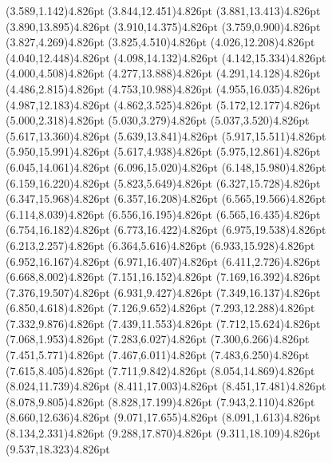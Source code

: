 \documentclass[10pt]{article}
\begin{document}
{{\qdisk(3.589,1.142){4.826pt}%
\qdisk(3.844,12.451){4.826pt}%
\qdisk(3.881,13.413){4.826pt}%
\qdisk(3.890,13.895){4.826pt}%
\qdisk(3.910,14.375){4.826pt}%
\qdisk(3.759,0.900){4.826pt}%
\qdisk(3.827,4.269){4.826pt}%
\qdisk(3.825,4.510){4.826pt}%
\qdisk(4.026,12.208){4.826pt}%
\qdisk(4.040,12.448){4.826pt}%
\qdisk(4.098,14.132){4.826pt}%
\qdisk(4.142,15.334){4.826pt}%
\qdisk(4.000,4.508){4.826pt}%
\qdisk(4.277,13.888){4.826pt}%
\qdisk(4.291,14.128){4.826pt}%
\qdisk(4.486,2.815){4.826pt}%
\qdisk(4.753,10.988){4.826pt}%
\qdisk(4.955,16.035){4.826pt}%
\qdisk(4.987,12.183){4.826pt}%
\qdisk(4.862,3.525){4.826pt}%
\qdisk(5.172,12.177){4.826pt}%
\qdisk(5.000,2.318){4.826pt}%
\qdisk(5.030,3.279){4.826pt}%
\qdisk(5.037,3.520){4.826pt}%
\qdisk(5.617,13.360){4.826pt}%
\qdisk(5.639,13.841){4.826pt}%
\qdisk(5.917,15.511){4.826pt}%
\qdisk(5.950,15.991){4.826pt}%
\qdisk(5.617,4.938){4.826pt}%
\qdisk(5.975,12.861){4.826pt}%
\qdisk(6.045,14.061){4.826pt}%
\qdisk(6.096,15.020){4.826pt}%
\qdisk(6.148,15.980){4.826pt}%
\qdisk(6.159,16.220){4.826pt}%
\qdisk(5.823,5.649){4.826pt}%
\qdisk(6.327,15.728){4.826pt}%
\qdisk(6.347,15.968){4.826pt}%
\qdisk(6.357,16.208){4.826pt}%
\qdisk(6.565,19.566){4.826pt}%
\qdisk(6.114,8.039){4.826pt}%
\qdisk(6.556,16.195){4.826pt}%
\qdisk(6.565,16.435){4.826pt}%
\qdisk(6.754,16.182){4.826pt}%
\qdisk(6.773,16.422){4.826pt}%
\qdisk(6.975,19.538){4.826pt}%
\qdisk(6.213,2.257){4.826pt}%
\qdisk(6.364,5.616){4.826pt}%
\qdisk(6.933,15.928){4.826pt}%
\qdisk(6.952,16.167){4.826pt}%
\qdisk(6.971,16.407){4.826pt}%
\qdisk(6.411,2.726){4.826pt}%
\qdisk(6.668,8.002){4.826pt}%
\qdisk(7.151,16.152){4.826pt}%
\qdisk(7.169,16.392){4.826pt}%
\qdisk(7.376,19.507){4.826pt}%
\qdisk(6.931,9.427){4.826pt}%
\qdisk(7.349,16.137){4.826pt}%
\qdisk(6.850,4.618){4.826pt}%
\qdisk(7.126,9.652){4.826pt}%
\qdisk(7.293,12.288){4.826pt}%
\qdisk(7.332,9.876){4.826pt}%
\qdisk(7.439,11.553){4.826pt}%
\qdisk(7.712,15.624){4.826pt}%
\qdisk(7.068,1.953){4.826pt}%
\qdisk(7.283,6.027){4.826pt}%
\qdisk(7.300,6.266){4.826pt}%
\qdisk(7.451,5.771){4.826pt}%
\qdisk(7.467,6.011){4.826pt}%
\qdisk(7.483,6.250){4.826pt}%
\qdisk(7.615,8.405){4.826pt}%
\qdisk(7.711,9.842){4.826pt}%
\qdisk(8.054,14.869){4.826pt}%
\qdisk(8.024,11.739){4.826pt}%
\qdisk(8.411,17.003){4.826pt}%
\qdisk(8.451,17.481){4.826pt}%
\qdisk(8.078,9.805){4.826pt}%
\qdisk(8.828,17.199){4.826pt}%
\qdisk(7.943,2.110){4.826pt}%
\qdisk(8.660,12.636){4.826pt}%
\qdisk(9.071,17.655){4.826pt}%
\qdisk(8.091,1.613){4.826pt}%
\qdisk(8.134,2.331){4.826pt}%
\qdisk(9.288,17.870){4.826pt}%
\qdisk(9.311,18.109){4.826pt}%
\qdisk(9.537,18.323){4.826pt}%
}}
\end{document}
